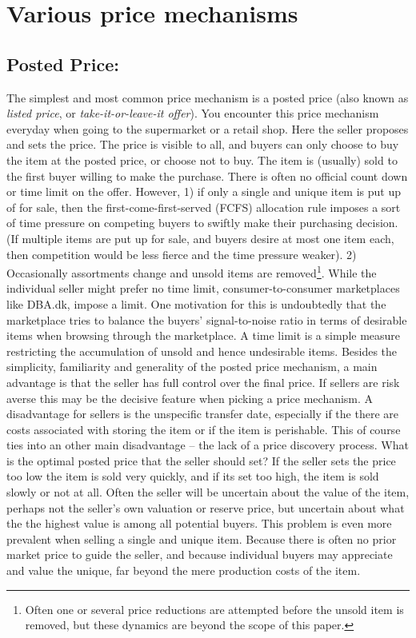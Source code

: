 \documentclass[a4paper,12pt]{article}
\begin{document}
	\section{Various price mechanisms}

	\subsection{Posted Price:}
	The simplest and most common price mechanism is a posted price (also known as {\it listed price}, or {\it take-it-or-leave-it offer}). You encounter this price mechanism everyday when going to the supermarket or a retail shop. Here the seller proposes and sets the price. The price is visible to all, and buyers can only choose to buy the item at the posted price, or choose not to buy. The item is (usually) sold to the first buyer willing to make the purchase. There is often no official count down or time limit on the offer. However, 1) if only a single and unique item is put up of for sale, then the first-come-first-served (FCFS) allocation rule imposes a sort of time pressure on competing buyers to swiftly make their purchasing decision. (If multiple items are put up for sale, and buyers desire at most one item each, then competition would be less fierce and the time pressure weaker). 2) Occasionally assortments change and unsold items are removed\footnote{Often one or several price reductions are attempted before the unsold item is removed, but these dynamics are beyond the scope of this paper.}. While the individual seller might prefer no time limit, consumer-to-consumer marketplaces like DBA.dk, impose a limit. One motivation for this is undoubtedly that the marketplace tries to balance the buyers' signal-to-noise ratio in terms of desirable items when browsing through the marketplace. A time limit is a simple measure restricting the accumulation of unsold and hence undesirable items. Besides the simplicity, familiarity and generality of the posted price mechanism, a main advantage is that the seller has full control over the final price. If sellers are risk averse this may be the decisive feature when picking a price mechanism. A disadvantage for sellers is the unspecific transfer date, especially if the there are costs associated with storing the item or if the item is perishable. This of course ties into an other main disadvantage -- the lack of a price discovery process. What is the optimal posted price that the seller should set? If the seller sets the price too low the item is sold very quickly, and if its set too high, the item is sold slowly or not at all. Often the seller will be uncertain about the value of the item, perhaps not the seller's own valuation or reserve price, but uncertain about what the the highest value is among all potential buyers. This problem is even more prevalent when selling a single and unique item. Because there is often no prior market price to guide the seller, and because individual buyers may appreciate and value the unique, far beyond the mere production costs of the item.
\end{document}

